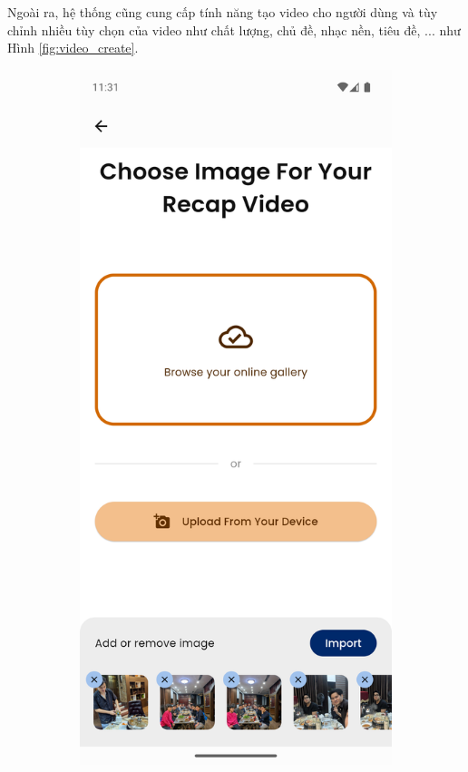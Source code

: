 Ngoài ra, hệ thống cũng cung cấp tính năng tạo video cho người dùng và tùy chỉnh nhiều tùy chọn của video như chất lượng, chủ đề, nhạc nền, tiêu đề, ... như Hình \ref{fig:video_create}.

\begin{figure}[H]
    \centering
    \begin{subfigure}{0.48\textwidth}
        \includegraphics[width=1\linewidth]{figures/c4/4-2/create_video_1.png} 

\end{subfigure}
\end{figure}
